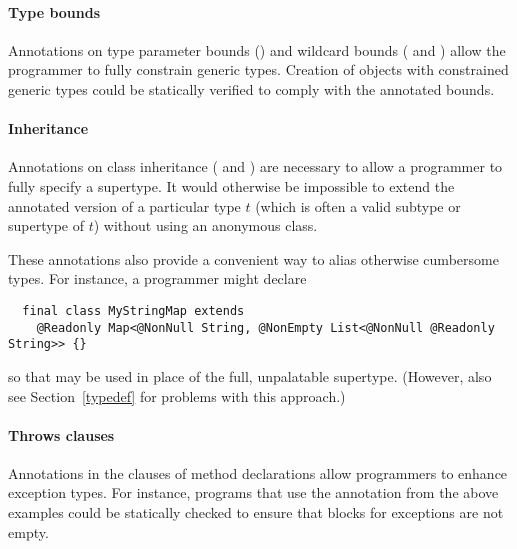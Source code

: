 \documentclass[10pt]{article}
\begin{document}

\paragraph{Type bounds}
Annotations on type parameter bounds ()
and wildcard bounds ( and )
allow the programmer to fully constrain generic types.  Creation of
objects with constrained generic types could be statically verified to
comply with the annotated bounds.

\paragraph{Inheritance}
Annotations on class inheritance ( and
) are necessary to allow a programmer to fully
specify a supertype. It would otherwise be impossible to extend the
annotated version of a particular type $t$ (which is often a valid
subtype or supertype of $t$) without using an anonymous class.

\noindent
\label{class-inheritance-annotations}
These annotations also provide a convenient way to alias otherwise
cumbersome types. For instance, a programmer might declare

\begin{Verbatim}
  final class MyStringMap extends
    @Readonly Map<@NonNull String, @NonEmpty List<@NonNull @Readonly String>> {}
\end{Verbatim}

\noindent
so that  may be used in place of the full,
unpalatable supertype.  (However, also see Section~\ref{typedef} for
problems with this approach.)

\paragraph{Throws clauses}
Annotations in the  clauses of method declarations allow
programmers to enhance exception types. For instance, programs that
use the  annotation from the above examples could be
statically checked to ensure that  blocks for
 exceptions are not empty.
\end{document}
